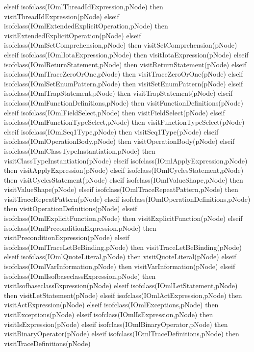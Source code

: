 \begin{vdm_al}
      elseif isofclass(IOmlThreadIdExpression,pNode) then visitThreadIdExpression(pNode)
      elseif isofclass(IOmlExtendedExplicitOperation,pNode) then visitExtendedExplicitOperation(pNode)
      elseif isofclass(IOmlSetComprehension,pNode) then visitSetComprehension(pNode)
      elseif isofclass(IOmlIotaExpression,pNode) then visitIotaExpression(pNode)
      elseif isofclass(IOmlReturnStatement,pNode) then visitReturnStatement(pNode)
      elseif isofclass(IOmlTraceZeroOrOne,pNode) then visitTraceZeroOrOne(pNode)
      elseif isofclass(IOmlSetEnumPattern,pNode) then visitSetEnumPattern(pNode)
      elseif isofclass(IOmlTrapStatement,pNode) then visitTrapStatement(pNode)
      elseif isofclass(IOmlFunctionDefinitions,pNode) then visitFunctionDefinitions(pNode)
      elseif isofclass(IOmlFieldSelect,pNode) then visitFieldSelect(pNode)
      elseif isofclass(IOmlFunctionTypeSelect,pNode) then visitFunctionTypeSelect(pNode)
      elseif isofclass(IOmlSeq1Type,pNode) then visitSeq1Type(pNode)
      elseif isofclass(IOmlOperationBody,pNode) then visitOperationBody(pNode)
      elseif isofclass(IOmlClassTypeInstantiation,pNode) then visitClassTypeInstantiation(pNode)
      elseif isofclass(IOmlApplyExpression,pNode) then visitApplyExpression(pNode)
      elseif isofclass(IOmlCyclesStatement,pNode) then visitCyclesStatement(pNode)
      elseif isofclass(IOmlValueShape,pNode) then visitValueShape(pNode)
      elseif isofclass(IOmlTraceRepeatPattern,pNode) then visitTraceRepeatPattern(pNode)
      elseif isofclass(IOmlOperationDefinitions,pNode) then visitOperationDefinitions(pNode)
      elseif isofclass(IOmlExplicitFunction,pNode) then visitExplicitFunction(pNode)
      elseif isofclass(IOmlPreconditionExpression,pNode) then visitPreconditionExpression(pNode)
      elseif isofclass(IOmlTraceLetBeBinding,pNode) then visitTraceLetBeBinding(pNode)
      elseif isofclass(IOmlQuoteLiteral,pNode) then visitQuoteLiteral(pNode)
      elseif isofclass(IOmlVarInformation,pNode) then visitVarInformation(pNode)
      elseif isofclass(IOmlIsofbaseclassExpression,pNode) then visitIsofbaseclassExpression(pNode)
      elseif isofclass(IOmlLetStatement,pNode) then visitLetStatement(pNode)
      elseif isofclass(IOmlActExpression,pNode) then visitActExpression(pNode)
      elseif isofclass(IOmlExceptions,pNode) then visitExceptions(pNode)
      elseif isofclass(IOmlIsExpression,pNode) then visitIsExpression(pNode)
      elseif isofclass(IOmlBinaryOperator,pNode) then visitBinaryOperator(pNode)
      elseif isofclass(IOmlTraceDefinitions,pNode) then visitTraceDefinitions(pNode)

\end{vdm_al}
